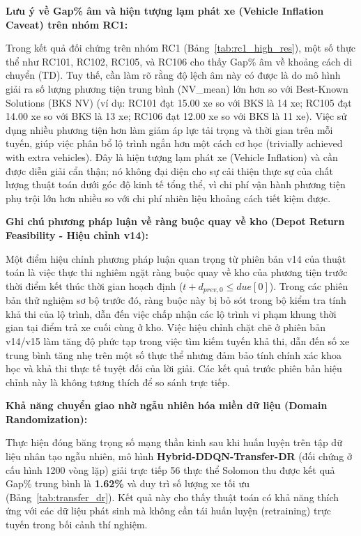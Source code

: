 \documentclass[13pt,a4paper]{extarticle}
\begin{document}
\textbf{Lưu ý về Gap\% âm và hiện tượng lạm phát xe (Vehicle Inflation Caveat) trên nhóm RC1:}

Trong kết quả đối chứng trên nhóm RC1 (Bảng~\ref{tab:rc1_high_res}), một số thực thể như RC101, RC102, RC105, và RC106 cho thấy Gap\% âm về khoảng cách di chuyển (TD). Tuy thế, cần làm rõ rằng độ lệch âm này có được là do mô hình giải ra số lượng phương tiện trung bình (NV\_mean) lớn hơn so với Best-Known Solutions (BKS NV) (ví dụ: RC101 đạt 15.00 xe so với BKS là 14 xe; RC105 đạt 14.00 xe so với BKS là 13 xe; RC106 đạt 12.00 xe so với BKS là 11 xe). Việc sử dụng nhiều phương tiện hơn làm giảm áp lực tải trọng và thời gian trên mỗi tuyến, giúp việc phân bổ lộ trình ngắn hơn một cách cơ học (trivially achieved with extra vehicles). Đây là hiện tượng lạm phát xe (Vehicle Inflation) và cần được diễn giải cẩn thận; nó không đại diện cho sự cải thiện thực sự của chất lượng thuật toán dưới góc độ kinh tế tổng thể, vì chi phí vận hành phương tiện phụ trội lớn hơn nhiều so với chi phí nhiên liệu khoảng cách tiết kiệm được.

\textbf{Ghi chú phương pháp luận về ràng buộc quay về kho (Depot Return Feasibility - Hiệu chỉnh v14):}

Một điểm hiệu chỉnh phương pháp luận quan trọng từ phiên bản v14 của thuật toán là việc thực thi nghiêm ngặt ràng buộc quay về kho của phương tiện trước thời điểm kết thúc thời gian hoạch định ($t + d_{prev, 0} \le due[0]$). Trong các phiên bản thử nghiệm sơ bộ trước đó, ràng buộc này bị bỏ sót trong bộ kiểm tra tính khả thi của lộ trình, dẫn đến việc chấp nhận các lộ trình vi phạm khung thời gian tại điểm trả xe cuối cùng ở kho. Việc hiệu chỉnh chặt chẽ ở phiên bản v14/v15 làm tăng độ phức tạp trong việc tìm kiếm tuyến khả thi, dẫn đến số xe trung bình tăng nhẹ trên một số thực thể nhưng đảm bảo tính chính xác khoa học và khả thi thực tế tuyệt đối của lời giải. Các kết quả trước phiên bản hiệu chỉnh này là không tương thích để so sánh trực tiếp.

\textbf{Khả năng chuyển giao nhờ ngẫu nhiên hóa miền dữ liệu (Domain Randomization):}

Thực hiện đóng băng trọng số mạng thần kinh sau khi huấn luyện trên tập dữ liệu nhân tạo ngẫu nhiên, mô hình \textbf{Hybrid-DDQN-Transfer-DR} (đối chứng ở cấu hình 1200 vòng lặp) giải trực tiếp 56 thực thể Solomon thu được kết quả Gap\% trung bình là \textbf{1.62\%} và duy trì số lượng xe tối ưu (Bảng~\ref{tab:transfer_dr}). Kết quả này cho thấy thuật toán có khả năng thích ứng với các dữ liệu phát sinh mà không cần tái huấn luyện (retraining) trực tuyến trong bối cảnh thí nghiệm.
\end{document}
